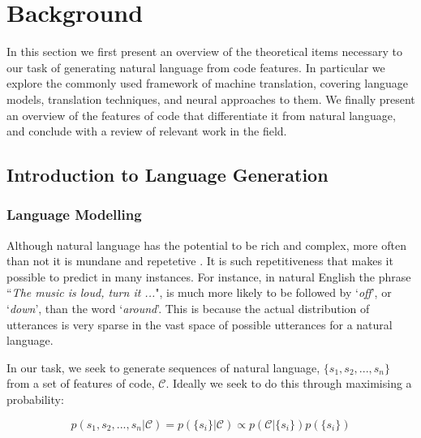 \chapter{Background}
\label{background}

In this section we first present an overview of the theoretical items necessary to our task of generating natural language from code features.
In particular we explore the commonly used framework of machine translation, covering language models, translation techniques, and neural approaches to them. 
We finally present an overview of the features of code that differentiate it from natural language, and conclude with a review of relevant work in the field.

\section{Introduction to Language Generation} %
\label{sec:lstm}

\subsection{Language Modelling} %
\label{sub:recurrent_neural_networks}

Although natural language has the potential to be rich and complex, more often than not it is mundane and repetetive \cite{hindle_naturalness_nodate}. 
It is such repetitiveness that makes it possible to predict in many instances. For instance, in natural English the phrase ``\textit{The music is loud, turn it ...}", is much more likely to be followed by `\textit{off}', or `\textit{down}', than the word `\textit{around}'.
This is because the actual distribution of utterances is very sparse in  the vast space of possible utterances for a natural language.

In our task, we seek to generate sequences of natural language, $\{s_1, s_2,..., s_n\}$ from a set of features of code, $\mathcal{C}$.
Ideally we seek to do this through maximising a probability:

$$p(s_1, s_2,...,s_n | \mathcal{C}) = p(\{s_i\}| \mathcal{C}) \propto p(\mathcal{C} | \{s_i\})  p(\{s_i\})$$

